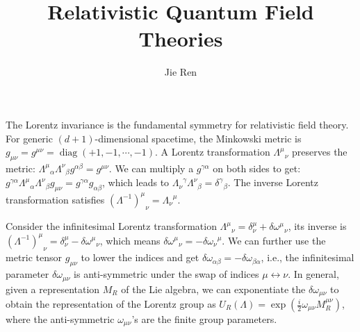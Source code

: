 \documentclass[aps,prb,superscriptaddress,nofootinbib]{revtex4}
\begin{document}
\title{Relativistic Quantum Field Theories}
\author{Jie Ren}



\maketitle


The Lorentz invariance is the fundamental symmetry for relativistic field theory.
For generic $(d+1)$-dimensional spacetime, the Minkowski metric is $g_{\mu\nu}=g^{\mu\nu} = \operatorname{diag}(+1,-1,\cdots,-1)$.
A Lorentz transformation ${\Lambda^{\mu}}_{\nu}$ preserves the metric: ${\Lambda^{\mu}}_{\alpha}{\Lambda^{\nu}}_{\beta} g^{\alpha\beta} = g^{\mu\nu}$.
We can multiply a $g^{\gamma\alpha}$ on both sides to get: $g^{\gamma\alpha}{\Lambda^{\mu}}_{\alpha}{\Lambda^{\nu}}_{\beta} g_{\mu\nu} = g^{\gamma\alpha}g_{\alpha\beta}$, which leads to ${\Lambda_{\nu}}^{\gamma}{\Lambda^{\nu}}_{\beta} = {\delta^{\gamma}}_{\beta}$.
The inverse Lorentz transformation satisfies ${(\Lambda^{-1})^{\mu}}_{\nu} = {\Lambda_{\nu}}^{\mu}$.

Consider the infinitesimal Lorentz transformation ${\Lambda^{\mu}}_{\nu} = \delta^{\mu}_{\nu}+\delta{\omega^{\mu}}_{\nu}$, its inverse is ${(\Lambda^{-1})^\mu}_\nu = \delta^{\mu}_{\nu}-\delta{\omega^\mu}_\nu$, which means $\delta {\omega^\mu}_\nu = -\delta {\omega_\nu}^\mu$.
We can further use the metric tensor $g_{\mu\nu}$ to lower the indices and get $\delta\omega_{\alpha\beta} = -\delta\omega_{\beta\alpha}$, i.e., the infinitesimal parameter $\delta \omega_{\mu\nu}$ is anti-symmetric under the swap of indices $\mu \leftrightarrow \nu$.
In general, given a representation $M_R$ of the Lie algebra, we can exponentiate the $\delta \omega_{\mu\nu}$ to obtain the representation of the Lorentz group as $U_R(\Lambda) = \exp\left(\frac{i}{2}\omega_{\mu\nu}M_R^{\mu\nu}\right)$, where the anti-symmetric $\omega_{\mu\nu}$'s are the finite group parameters.


\tableofcontents
\end{document}
